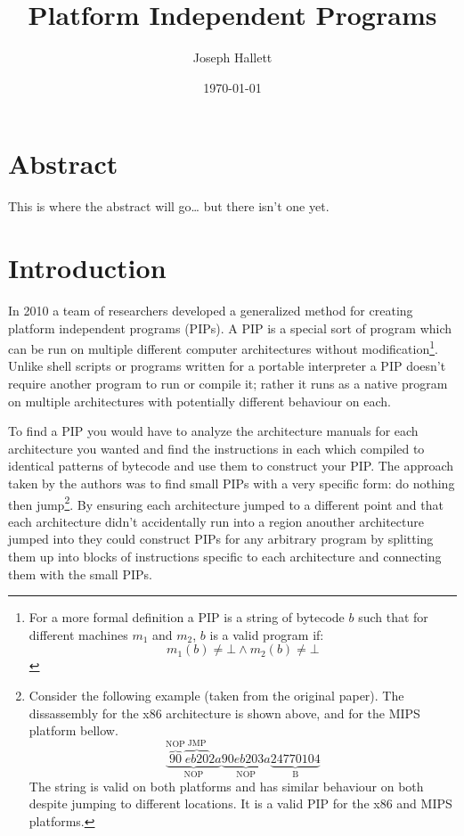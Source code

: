 \documentclass[]{book}
\title{Platform Independent Programs}
\author{Joseph Hallett}
\date{\today}
\begin{document}
\maketitle

\tableofcontents

\chapter{Abstract}

This is where the abstract will go\ldots{} but there isn't one yet.

\chapter{Introduction}

In 2010 a team of researchers developed a generalized method for
creating platform independent programs (PIPs)\autocite{Cha:2010uh}. A
PIP is a special sort of program which can be run on multiple different
computer architectures without modification\footnote{For a more formal
  definition a PIP is a string of bytecode $b$ such that for different
  machines $m_1$ and $m_2$, $b$ is a valid program if: \[m_1(b)
  \not = \bot \wedge m_2(b) \not =\bot\]}. Unlike shell scripts or
programs written for a portable interpreter a PIP doesn't require
another program to run or compile it; rather it runs as a native program
on multiple architectures with potentially different behaviour on each.

To find a PIP you would have to analyze the architecture manuals for
each architecture you wanted and find the instructions in each which
compiled to identical patterns of bytecode and use them to construct
your PIP. The approach taken by the authors was to find small PIPs with
a very specific form: do nothing then jump\footnote{Consider the
  following example (taken from the original paper). The dissassembly
  for the x86 architecture is shown above, and for the MIPS platform
  bellow.
  \[\underbrace{\overbrace{90}^{\text{NOP}} \overbrace{eb20}^{\text{JMP}}
  2a }_{\text{NOP}} \underbrace{90eb203a}_{\text{NOP}}
  \underbrace{24770104}_{\text{B}}\] The string is valid on both
  platforms and has similar behaviour on both despite jumping to
  different locations. It is a valid PIP for the x86 and MIPS platforms.}.
By ensuring each architecture jumped to a different point and that each
architecture didn't accidentally run into a region anouther architecture
jumped into they could construct PIPs for any arbitrary program by
splitting them up into blocks of instructions specific to each
architecture and connecting them with the small PIPs.
\end{document}
